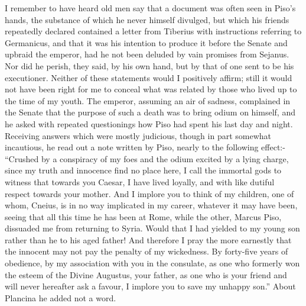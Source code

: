 I remember to have heard old men say that a document was often seen in Piso's hands, the substance of which he never himself divulged, but which his friends repeatedly declared contained a letter from Tiberius with instructions referring to Germanicus, and that it was his intention to produce it before the Senate and upbraid the emperor, had he not been deluded by vain promises from Sejanus. Nor did he perish, they said, by his own hand, but by that of one sent to be his executioner. Neither of these statements would I positively affirm; still it would not have been right for me to conceal what was related by those who lived up to the time of my youth. The emperor, assuming an air of sadness, complained in the Senate that the purpose of such a death was to bring odium on himself, and he asked with repeated questionings how Piso had spent his last day and night. Receiving answers which were mostly judicious, though in part somewhat incautious, he read out a note written by Piso, nearly to the following effect:- ``Crushed by a conspiracy of my foes and the odium excited by a lying charge, since my truth and innocence find no place here, I call the immortal gods to witness that towards you Caesar, I have lived loyally, and with like dutiful respect towards your mother. And I implore you to think of my children, one of whom, Cneius, is in no way implicated in my career, whatever it may have been, seeing that all this time he has been at Rome, while the other, Marcus Piso, dissuaded me from returning to Syria. Would that I had yielded to my young son rather than he to his aged father! And therefore I pray the more earnestly that the innocent may not pay the penalty of my wickedness. By forty-five years of obedience, by my association with you in the consulate, as one who formerly won the esteem of the Divine Augustus, your father, as one who is your friend and will never hereafter ask a favour, I implore you to save my unhappy son.'' About Plancina he added not a word.


